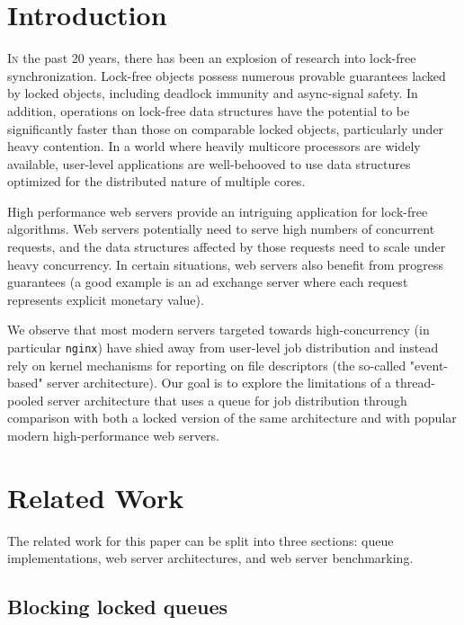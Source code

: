 \documentclass[twoside,10pt]{article}
\begin{document}
\begin{multicols}{2}
 
\section{Introduction}

\lettrine[nindent=0em,lines=3]{I}n the past 20 years, there has been
an explosion of research into lock-free synchronization. Lock-free
objects possess numerous provable guarantees lacked by locked objects,
including deadlock immunity and async-signal safety. In addition,
operations on lock-free data structures have the potential to be
significantly faster than those on comparable locked objects,
particularly under heavy contention. In a world where heavily multicore
processors are widely available, user-level applications are
well-behooved to use data structures optimized for the distributed
nature of multiple cores.
  
High performance web servers provide an intriguing application for
lock-free algorithms. Web servers potentially need to serve high
numbers of concurrent requests, and the data structures affected by
those requests need to scale under heavy concurrency. In certain
situations, web servers also benefit from progress guarantees (a good
example is an ad exchange server where each request represents
explicit monetary value).

We observe that most modern servers targeted towards high-concurrency
(in particular \verb+nginx+) have shied away from user-level job
distribution and instead rely on kernel mechanisms for reporting on
file descriptors (the so-called "event-based" server
architecture). Our goal is to explore the limitations of a
thread-pooled server architecture that uses a queue for job
distribution through comparison with both a locked version of the same
architecture and with popular modern high-performance web servers.

\section{Related Work}

The related work for this paper can be split into three sections:
queue implementations, web server architectures, and web
server benchmarking.

\subsection{Blocking locked queues}


\end{multicols}
\end{document}
